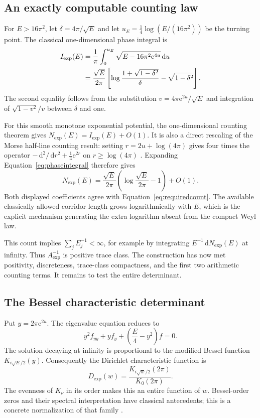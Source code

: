 \documentclass[11pt,letterpaper]{article}
\numberwithin{equation}{section}
\theoremstyle{definition}
\theoremstyle{remark}
\newcommand{\dd}{\,\mathrm d}
\newcommand{\e}{\mathrm e}
\begin{document}
\subsection{An exactly computable counting law}
For $E>16\pi^2$, let $\delta=4\pi/\sqrt E$ and let $u_E=\frac14\log(E/(16\pi^2))$ be the turning point. The classical one-dimensional phase integral is
\begin{align}
 I_{\mathrm{exp}}(E)
 &=\frac1\pi\int_0^{u_E}\sqrt{E-16\pi^2\e^{4u}}\dd u\notag\\
 &=\frac{\sqrt E}{2\pi}
 \left[\log\frac{1+\sqrt{1-\delta^2}}{\delta}
       -\sqrt{1-\delta^2}\right].
 \label{eq:phaseintegral}
\end{align}
The second equality follows from the substitution $v=4\pi\e^{2u}/\sqrt E$ and integration of $\sqrt{1-v^2}/v$ between $\delta$ and one.

For this smooth monotone exponential potential, the one-dimensional counting theorem gives $N_{\mathrm{exp}}(E)=I_{\mathrm{exp}}(E)+O(1)$. It is also a direct rescaling of the Morse half-line counting result: setting $r=2u+\log(4\pi)$ gives four times the operator $-\dd^2/\dd r^2+\frac14\e^{2r}$ on $r\geq\log(4\pi)$ \cite{lagarias}. Expanding Equation~\eqref{eq:phaseintegral} therefore gives
\begin{equation}
 N_{\mathrm{exp}}(E)
 =\frac{\sqrt E}{2\pi}
   \left(\log\frac{\sqrt E}{2\pi}-1\right)+O(1).
 \label{eq:expcount}
\end{equation}
Both displayed coefficients agree with Equation~\eqref{eq:requiredcount}. The available classically allowed corridor length grows logarithmically with $E$, which is the explicit mechanism generating the extra logarithm absent from the compact Weyl law.

This count implies $\sum_jE_j^{-1}<\infty$, for example by integrating $E^{-1}\dd N_{\mathrm{exp}}(E)$ at infinity. Thus $A_{\mathrm{exp}}^{-1}$ is positive trace class. The construction has now met positivity, discreteness, trace-class compactness, and the first two arithmetic counting terms. It remains to test the entire determinant.

\subsection{The Bessel characteristic determinant}
Put $y=2\pi\e^{2u}$. The eigenvalue equation reduces to
\begin{equation}
 y^2f_{yy}+yf_y+\left(\frac E4-y^2\right)f=0.
\end{equation}
The solution decaying at infinity is proportional to the modified Bessel function $K_{i\sqrt E/2}(y)$. Consequently the Dirichlet characteristic function is
\begin{equation}
 D_{\mathrm{exp}}(w)
 =\frac{K_{i\sqrt w/2}(2\pi)}{K_0(2\pi)}.
 \label{eq:besseldet}
\end{equation}
The evenness of $K_\nu$ in its order makes this an entire function of $w$. Bessel-order zeros and their spectral interpretation have classical antecedents; this is a concrete normalization of that family \cite{lagarias,dlmf}.
\end{document}
